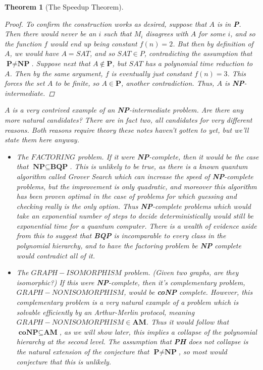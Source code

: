 \documentclass{article}
\theoremstyle{definition}
\theoremstyle{plain}
\theoremstyle{theorem}
\newtheorem{theorem}{Theorem}[section]
\begin{document}
\begin{theorem}[The Speedup Theorem]
\begin{proof}
	\par To confirm the construction works as desired, suppose that $A$ is in \textbf{P}. Then there would never be an $i$ such that $M_i$ disagrees with $A$ for some $i$, and so the function $f$ would end up being constant $f(n) = 2$. But then by definition of $A$, we would have $A = SAT$, and so $SAT \in P$, contradicting the assumption that $\textbf{P} \neq \textbf{NP}$. Suppose next that $A \notin \textbf{P}$, but $SAT$ has a polynomial time reduction to $A$. Then by the same argument, $f$ is eventually just constant $f(n)=3$. This forces the set $A$ to be finite, so $A \in \textbf{P}$, another contradiction. Thus, $A$ is \textbf{NP}-intermediate.
\end{proof} 
$A$ is a very contrived example of an \textbf{NP}-intermediate problem. Are there any more natural candidates? There are in fact two, all candidates for very different reasons. Both reasons require theory these notes haven't gotten to yet, but we'll state them here anyway.
\begin{itemize}
	\item The $FACTORING$ problem. If it were \textbf{NP}-complete, then it would be the case that $\textbf{NP} \subseteq \textbf{BQP}$. This is unlikely to be true, as there is a known quantum algorithm called Grover Search which can increase the speed of \textbf{NP}-complete problems, but the improvement is only quadratic, and moreover this algorithm has been proven \textit{optimal} in the case of problems for which guessing and checking really is the only option. Thus \textbf{NP}-complete problems which would take an exponential number of steps to decide deterministically would still be exponential time for a quantum computer. There is a wealth of evidence aside from this to suggest that \textbf{BQP} is incomparable to every class in the polynomial hierarchy, and to have the factoring problem be \textbf{NP} complete would contradict all of it.
	\item The $GRAPH-ISOMORPHISM$ problem. (Given two graphs, are they isomorphic?) If this were \textbf{NP}-complete, then it's complementary problem, $GRAPH-NONISOMORPHISM$, would be \textbf{coNP} complete. However, this complementary problem is a very natural example of a problem which is solvable efficiently by an Arthur-Merlin protocol, meaning $GRAPH-NONISOMORPHISM \in \textbf{AM}$. Thus it would follow that $\textbf{coNP} \subseteq \textbf{AM}$, as we will show later, this implies a collapse of the polynomial hierarchy at the second level. The assumption that \textbf{PH} does not collapse is the natural extension of the conjecture that $\textbf{P} \neq \textbf{NP}$, so most would conjecture that this is unlikely.
\end{itemize}

\end{theorem}
\end{document}
